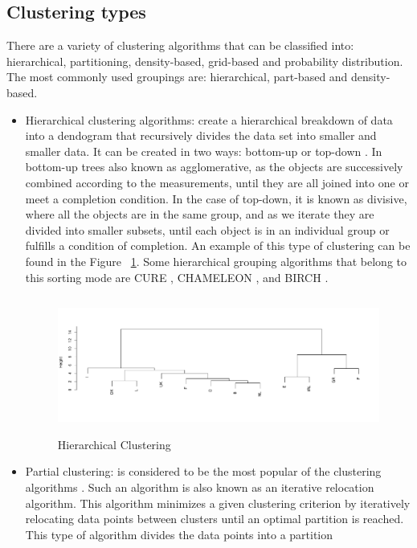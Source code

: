 \subsection*{Clustering types}

There are a variety of clustering algorithms that can be classified into: hierarchical, partitioning, density-based, grid-based and probability distribution. The most commonly used groupings are: hierarchical, part-based and density-based.
\\
\begin{itemize}
  \item Hierarchical clustering algorithms: create a hierarchical breakdown of data into a dendogram that recursively divides the data set into smaller and smaller data. It can be created in two ways: bottom-up or top-down \citep{b19}. In bottom-up trees also known as agglomerative, as the objects are successively combined according to the measurements, until they are all joined into one or meet a completion condition.  In the case of top-down, it is known as divisive, where all the objects are in the same group, and as we iterate they are divided into smaller subsets, until each object is in an individual group or fulfills a condition of completion. An example of this type of clustering can be found in the Figure ~\ref{fig:hierarchical}. Some hierarchical grouping algorithms that belong to this sorting mode are CURE \citep{b20}, CHAMELEON \citep{b21}, and BIRCH \citep{b22}.
\begin{figure}[htbp]
  \centering
   \includegraphics[width=14cm, height=4.5cm]{img/hierarchical.pdf}
    \caption{Hierarchical Clustering}
    \label{fig:hierarchical}%
\end{figure}
  \item Partial clustering: is considered to be the most popular of the clustering algorithms \citep{b23}. Such an algorithm is also known as an iterative relocation algorithm. This algorithm minimizes a given clustering criterion by iteratively relocating data points between clusters until an optimal partition is reached. This type of algorithm divides the data points into a partition

\end{itemize}
